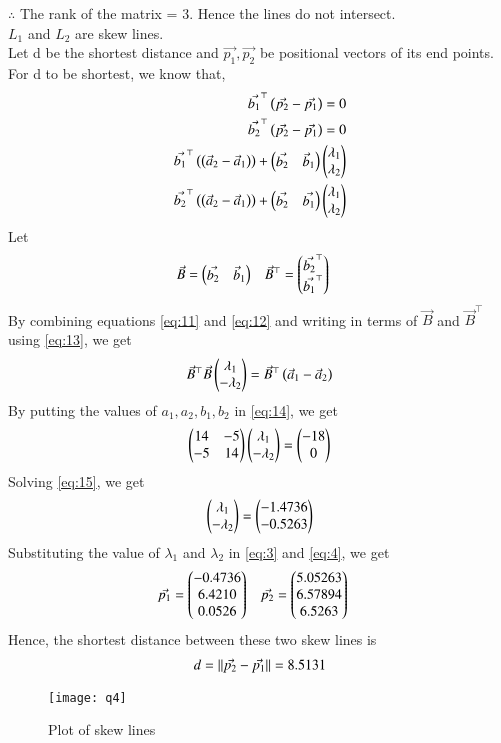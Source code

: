 \documentclass[journal,12pt,twocolumn]{IEEEtran}
\begin{document}
$\therefore$ The rank of the matrix = 3. Hence the lines do not intersect. \\
$L_{1}$ and $L_{2}$ are skew lines. \\
Let d be the shortest distance and $\Vec{p_{1}}, \Vec{p_{2}}$ be positional vectors of its end points.
For d to be shortest, we know that,
\begin{align}
    \label{eq:9}
    \Vec{b_{1}}^\top\left(\Vec{p_{2}}-\Vec{p_{1}}\right)=0\\
    \label{eq:10}
     \Vec{b_{2}}^\top\left(\Vec{p_{2}}-\Vec{p_{1}}\right)=0\\
     \label{eq:11}
     \Vec{b_{1}}^\top\left(\left(\Vec{a}_{2} - \Vec{a}_{1}\right)\right)+\begin{pmatrix}\Vec{b_{2}} & \Vec{b}_{1}\end{pmatrix}\begin{pmatrix}\lambda_{1} \\ \lambda_{2}\end{pmatrix}\\
     \label{eq:12}
     \Vec{b_{2}}^\top\left(\left(\Vec{a}_{2} - \Vec{a}_{1}\right)\right)+\begin{pmatrix}\Vec{b_{2}} & \Vec{b_{1}}\end{pmatrix}\begin{pmatrix}\lambda_{1} \\ \lambda_{2}\end{pmatrix}
\end{align}
Let 
\begin{align}
\label{eq:13}
    \Vec{B}&=\begin{pmatrix}\Vec{b_{2}} & \Vec{b}_{1}\end{pmatrix} & \Vec{B}^\top&=\begin{pmatrix}\Vec{b_{2}}^\top \\ \Vec{b_{1}}^\top\end{pmatrix}
\end{align}
By combining equations \eqref{eq:11} and \eqref{eq:12} and writing in terms of $\Vec{B}$ and $\Vec{B}^\top$ using \eqref{eq:13}, we get
\begin{align}
    \label{eq:14}
    \Vec{B}^\top\Vec{B}\begin{pmatrix}\lambda_{1} \\ -\lambda_{2}\end{pmatrix}= \Vec{B}^\top\left(\Vec{a}_{1} - \Vec{a}_{2}\right)
\end{align}
By putting the values of $a_{1},a_{2},b_{1},b_{2}$ in \eqref{eq:14}, we get
\begin{align}
    \label{eq:15}
    \begin{pmatrix}14 & -5 \\ -5 & 14\end{pmatrix}\begin{pmatrix}\lambda_{1} \\ -\lambda_{2}\end{pmatrix}=\begin{pmatrix}-18 \\ 0\end{pmatrix}
\end{align}
Solving \eqref{eq:15}, we get
\begin{align}
    \label{eq:16}
    \begin{pmatrix}\lambda_{1} \\ -\lambda_{2}\end{pmatrix}=\begin{pmatrix}-1.4736 \\ -0.5263\end{pmatrix}
\end{align}
Substituting the value of $\lambda_{1}$ and $\lambda_{2}$ in \eqref{eq:3} and \eqref{eq:4}, we get
\begin{align}
    \label{eq:17}
    \Vec{p_{1}} &= \begin{pmatrix}-0.4736 \\ 6.4210 \\ 0.0526 \end{pmatrix}   &    \Vec{p_{2}}&=\begin{pmatrix} 5.05263\\ 6.57894\\ 6.5263\end{pmatrix}
\end{align}
Hence, the shortest distance between these two skew lines is
\begin{align}
    \label{eq:18}
    d = \lVert\Vec{p_{2}}-\Vec{p_{1}}\rVert = 8.5131
\end{align}
\begin{figure}[h]
\centering
\texttt{[image: q4]}
\caption{Plot of skew lines}
\end{figure}
\end{document}
